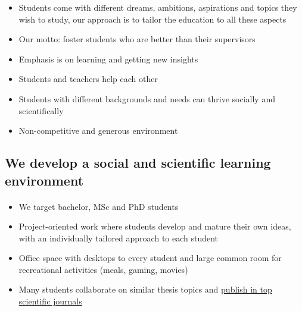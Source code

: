 \documentclass[%
twoside,                 %
final,                   %
10pt]{article}
\begin{document}
\begin{itemize}
 \item Students come with different dreams, ambitions, aspirations and topics they wish to study, our approach is to tailor the education to all these aspects

 \item Our motto: foster students who are better than their supervisors

 \item Emphasis is on learning and getting new insights

 \item Students and teachers help each other

 \item Students with different backgrounds and needs can thrive socially and scientifically

 \item Non-competitive and generous environment
\end{itemize}

\noindent





\subsection{We develop a social and scientific learning environment}


\paragraph{}
\begin{itemize}
\item We target bachelor, MSc and PhD students

\item Project-oriented work where students develop and mature their own ideas, with an individually tailored approach to each student

\item Office space with desktops to every student and large common room for recreational activities (meals, gaming, movies)

\item Many students collaborate on similar  thesis topics and \href{{http://www.dn.no/talent/2014/06/12/Utdannelse/sommervikar-ble-toppforsker}}{publish in top scientific journals}
\end{itemize}
\end{document}
